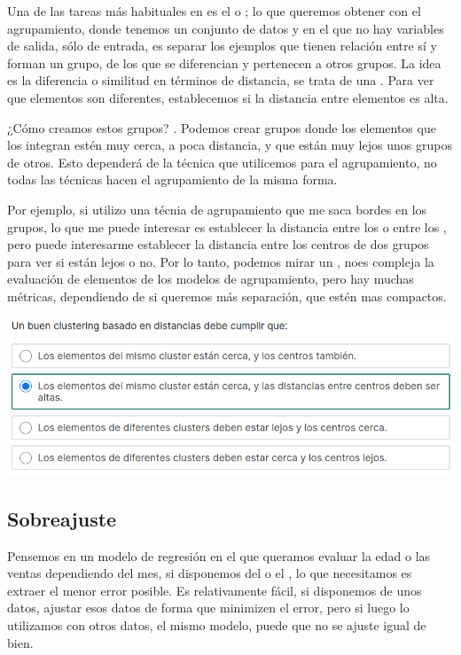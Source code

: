 Una de las tareas más habituales en  es el  o ; lo que queremos obtener con el agrupamiento, donde tenemos un conjunto de datos y en el que no hay variables de salida, sólo de entrada, es separar los ejemplos que tienen relación entre sí y forman un grupo, de los que se diferencian y pertenecen a otros grupos. La idea es la diferencia o similitud en términos de distancia, se trata de una . Para ver que elementos son diferentes, establecemos si la distancia entre elementos es alta.

¿Cómo creamos estos grupos? . Podemos crear grupos donde los elementos que los integran estén muy cerca, a poca distancia, y que están muy lejos unos grupos de otros. Esto dependerá de la técnica que utilicemos para el agrupamiento, no todas las técnicas hacen el agrupamiento de la misma forma.

Por ejemplo, si utilizo una técnia de agrupamiento que me saca bordes en los grupos, lo que me puede interesar es establecer la distancia entre los  o entre los , pero puede interesarme establecer la distancia entre los centros de dos grupos para ver si están lejos o no. Por lo tanto, podemos mirar un , noes compleja la evaluación de elementos de los modelos de agrupamiento, pero hay muchas métricas, dependiendo de si queremos más separación, que estén mas compactos.

\begin{center}
    \includegraphics[scale=.65]{images/mod02-04.png}
\end{center}

\subsection{Sobreajuste}

Pensemos en un modelo de regresión en el que queramos evaluar la edad o las ventas dependiendo del mes,  si disponemos del  o el , lo que necesitamos es extraer el menor error posible. Es relativamente fácil, si disponemos de unos datos, ajustar esos datos de forma que minimizen el error, pero si luego lo utilizamos con otros datos, el mismo modelo, puede que no se ajuste igual de bien.

